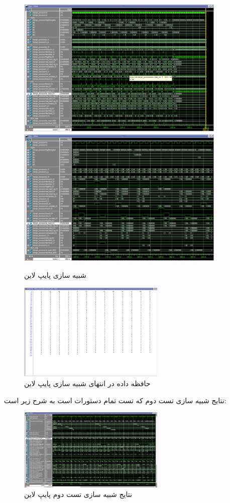 \documentclass[11pt, a4paper]{article}
\begin{document}
	\begin{figure}[H]
		\begin{center}
			\includegraphics[width=10cm]{Photos/7.png}
			\includegraphics[width=10cm]{Photos/8.png}
		\end{center}
		\caption{شبیه سازی پایپ لاین}
		\label{Pipeline_sim}
	\end{figure}
	
	\begin{figure}[H]
		\begin{center}
			\includegraphics[width=7cm]{Photos/9.png}
		\end{center}
		\caption{حافظه داده در انتهای شبیه سازی پایپ لاین}
		\label{Pipeline_data_mem}
	\end{figure}
	
	
نتایج شبیه سازی تست دوم که تست تمام دستورات است به شرح زیر است:
	\begin{figure}[H]
		\begin{center}
			\includegraphics[width=7cm]{Photos/10.png}
		\end{center}
		\caption{نتایج شبیه سازی تست دوم پایپ لاین}
		\label{mips2_pipeline_sim}
	\end{figure}
	
\end{document}
